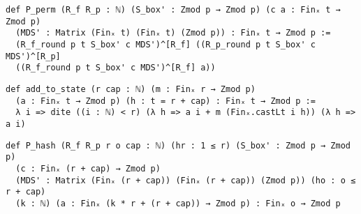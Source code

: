 \documentclass{article}
\theoremstyle{definition}
\theoremstyle{remark}
\begin{document}
\begin{lstlisting}
def P_perm (R_f R_p : ℕ) (S_box' : Zmod p → Zmod p) (c a : Finₓ t → Zmod p)
  (MDS' : Matrix (Finₓ t) (Finₓ t) (Zmod p)) : Finₓ t → Zmod p :=
  (R_f_round p t S_box' c MDS')^[R_f] ((R_p_round p t S_box' c MDS')^[R_p]
  ((R_f_round p t S_box' c MDS')^[R_f] a))
\end{lstlisting}

\begin{lstlisting}
def add_to_state (r cap : ℕ) (m : Finₓ r → Zmod p) 
  (a : Finₓ t → Zmod p) (h : t = r + cap) : Finₓ t → Zmod p :=
  λ i => dite ((i : ℕ) < r) (λ h => a i + m (Finₓ.castLt i h)) (λ h => a i)
\end{lstlisting}

\begin{lstlisting}
def P_hash (R_f R_p r o cap : ℕ) (hr : 1 ≤ r) (S_box' : Zmod p → Zmod p) 
  (c : Finₓ (r + cap) → Zmod p)
  (MDS' : Matrix (Finₓ (r + cap)) (Finₓ (r + cap)) (Zmod p)) (ho : o ≤ r + cap)
  (k : ℕ) (a : Finₓ (k * r + (r + cap)) → Zmod p) : Finₓ o → Zmod p
\end{lstlisting}



\end{document}
